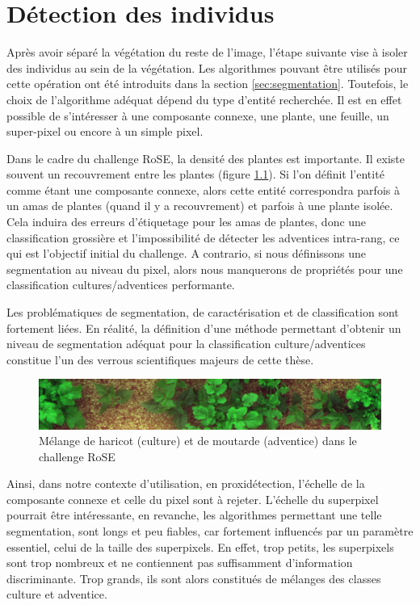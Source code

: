 \documentclass[../thesis.tex]{subfiles}
\begin{document}
	
	\chapter{Détection des individus}
	\label{chap:deep-leaf}
    
    Après avoir séparé la végétation du reste de l'image, l'étape suivante vise à isoler des individus au sein de la végétation. Les algorithmes pouvant être utilisés pour cette opération ont été introduits dans la section \ref{sec:segmentation}. Toutefois, le choix de l'algorithme adéquat dépend du type d'entité recherchée. Il est en effet possible de s'intéresser à une composante connexe, une plante, une feuille, un super-pixel ou encore à un simple pixel. 
    
    Dans le cadre du challenge RoSE, la densité des plantes est importante. Il existe souvent un recouvrement entre les plantes (figure \ref{fig:07-beans-mustard-mix}). Si l'on définit l'entité comme étant une composante connexe, alors cette entité correspondra parfois à un amas de plantes (quand il y a recouvrement) et parfois à une plante isolée. Cela induira des erreurs d'étiquetage pour les amas de plantes, donc une classification grossière et l'impossibilité de détecter les adventices intra-rang, ce qui est l'objectif initial du challenge. A contrario, si nous définissons une segmentation au niveau du pixel, alors nous manquerons de propriétés pour une classification cultures/adventices performante.
    
    Les problématiques de segmentation, de caractérisation et de classification sont fortement liées. En réalité, la définition d'une méthode permettant d'obtenir un niveau de segmentation adéquat pour la classification culture/adventices constitue l'un des verrous scientifiques majeurs de cette thèse.
    
    \begin{figure}[H]
        \centering
        \includegraphics[width=\linewidth]{img/leaf-plus/beans-mustard-mix}
        \caption{Mélange de haricot (culture) et de moutarde (adventice) dans le challenge RoSE}
        \label{fig:07-beans-mustard-mix}
    \end{figure}
    
    
    Ainsi, dans notre contexte d'utilisation, en proxidétection, l'échelle de la composante connexe et celle du pixel sont à rejeter. L'échelle du superpixel pourrait être intéressante, en revanche, les algorithmes permettant une telle segmentation, sont longs et peu fiables, car fortement influencés par un paramètre essentiel, celui de la taille des superpixels. En effet, trop petits, les superpixels sont trop nombreux et ne contiennent pas suffisamment d'information discriminante. Trop grands, ils sont alors constitués de mélanges des classes culture et adventice.
    
\end{document}
